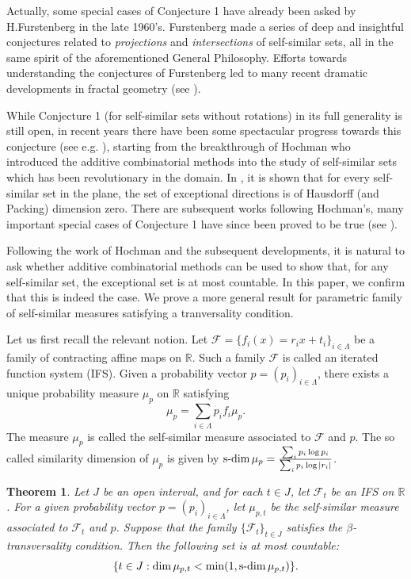 \documentclass[a4paper,11pt]{amsart}
\newtheorem{theorem}{Theorem}[section]
\theoremstyle{definition}
\numberwithin{equation}{section}
\def\F{\mathcal F}
\def\R{\mathbb R}
\DeclareMathOperator{\sd}{{\rm{s}\textrm{-}\rm{dim}}}
\begin{document}
Actually, some special cases of Conjecture 1 have already been asked by H.Furstenberg in the late 1960's.  Furstenberg made a series of deep and insightful conjectures related to {\em  projections} and {\em intersections} of self-similar sets, all in the same spirit of the aforementioned General Philosophy.  Efforts towards understanding the conjectures of Furstenberg led to many recent dramatic developments in fractal geometry (see \cite{Furstenberg69,Hochman2014,HS2012,HS2015,Shmerkin2019,Wu2019}).
\fi


While Conjecture 1 (for self-similar sets without rotations) in its full generality is still open,  in recent years there have been some spectacular progress towards this conjecture (see e.g.  \cite{BV2019,Hochman2014, Hochman-MAMS,Rapaport-Ann.ENS,Shmerkin2014,Shmerkin2019,Varju-Annals,Rapaport-Varju}),  starting from the breakthrough of Hochman \cite{Hochman2014} who introduced the additive combinatorial methods  into the study of self-similar sets which has been revolutionary in the domain.  In \cite{Hochman2014},  it is shown that for every self-similar set in the plane, the set of exceptional directions is of Hausdorff (and Packing) dimension zero.  There are subsequent works following Hochman's,  many important special cases of Conjecture 1 have since been  proved to be true (see \cite{Hochman2014,  BV2019, Shmerkin2019,  Varju-Annals,Rapaport-Ann.ENS,  Rapaport-Varju,  FengFeng}).

Following the work of Hochman and the subsequent developments,  it is natural to ask whether additive combinatorial methods can be used to show that, for any self-similar set, the exceptional set is at most countable. In this paper, we confirm that this is indeed the case.  We prove a more general result for parametric family of self-similar measures satisfying a tranversality condition.  

Let us first recall the relevant notion.  
Let $\F=\{f_i(x)=r_ix+t_i\}_{i\in \Lambda}$ be a family of contracting affine maps on $\R$.  Such a family $\F$ is called an iterated function system (IFS).  Given  a probability vector $p=(p_i)_{i\in \Lambda}$,  there exists a unique probability measure $\mu_p$ on $\R$ satisfying 
\[\mu_p=\sum_{i\in \Lambda}p_if_i\mu_p.\]
The measure $\mu_p$ is called the self-similar measure associated to $\F$ and $p$. The so called similarity dimension of $\mu_p$ is  given by $\sd \mu_p=\frac{\sum_ip_i\log p_i}{\sum_ip_i\log |r_i|}$. 
\begin{theorem}\label{thm:main:-2}
Let $J$ be an open  interval, and for each $t\in J$, let $\F_t$ be an IFS on $\R$. For a given probability vector $p=(p_i)_{i\in \Lambda}$, let $\mu_{p,t}$ be the self-similar measure associated to $\F_t$ and $p$.  Suppose that the family $\{\F_t\}_{t\in J}$ satisfies the $\beta$-transversality condition.  Then the following set is at most countable:
\[
\{t\in J: \dim \mu_{p,t}<\min (1,\sd \mu_{p,t})\}.
\]
\end{theorem}
\end{document}
